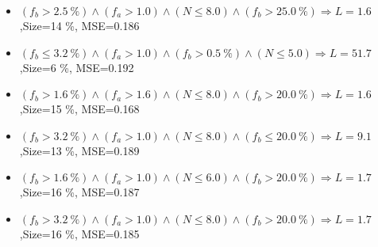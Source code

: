 \documentclass[numbered]{CSL}
\begin{document}
\begin{itemize}
\item $(f_b > 2.5~\%) \land (f_a > 1.0) \land (N \leq 8.0) \land (f_b > 25.0~\%) \Rightarrow L = 1.6$,\hfill Size=14 \%, MSE=0.186
\item $(f_b \leq 3.2~\%) \land (f_a > 1.0) \land (f_b > 0.5~\%) \land (N \leq 5.0) \Rightarrow L = 51.7$,\hfill Size=6 \%, MSE=0.192
\item $(f_b > 1.6~\%) \land (f_a > 1.6) \land (N \leq 8.0) \land (f_b > 20.0~\%) \Rightarrow L = 1.6$,\hfill Size=15 \%, MSE=0.168
\item $(f_b > 3.2~\%) \land (f_a > 1.0) \land (N \leq 8.0) \land (f_b \leq 20.0~\%) \Rightarrow L = 9.1$,\hfill Size=13 \%, MSE=0.189
\item $(f_b > 1.6~\%) \land (f_a > 1.0) \land (N \leq 6.0) \land (f_b > 20.0~\%) \Rightarrow L = 1.7$,\hfill Size=16 \%, MSE=0.187
\item $(f_b > 3.2~\%) \land (f_a > 1.0) \land (N \leq 8.0) \land (f_b > 20.0~\%) \Rightarrow L = 1.7$,\hfill Size=16 \%, MSE=0.185
\end{itemize}
\end{document}
